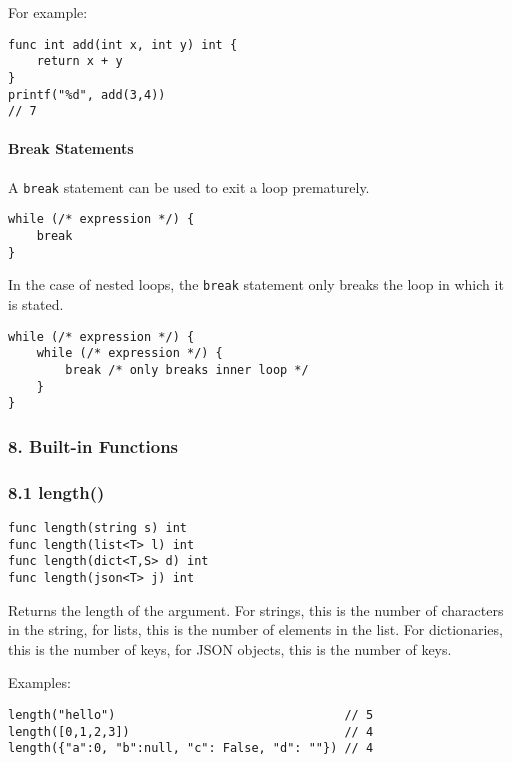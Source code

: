 For example:

\begin{verbatim}
func int add(int x, int y) int {
    return x + y
}
printf("%d", add(3,4))
// 7
\end{verbatim}

\paragraph{Break Statements}\label{break-statements}

A \texttt{break} statement can be used to exit a loop prematurely.

\begin{verbatim}
while (/* expression */) {
    break
}
\end{verbatim}

In the case of nested loops, the \texttt{break} statement only breaks
the loop in which it is stated.

\begin{verbatim}
while (/* expression */) {
    while (/* expression */) {
        break /* only breaks inner loop */
    }
}
\end{verbatim}

\subsubsection*{8. Built-in Functions}\label{built-in-functions}

\subsubsection*{8.1 length()}\label{length}

\begin{verbatim}
func length(string s) int
func length(list<T> l) int
func length(dict<T,S> d) int
func length(json<T> j) int
\end{verbatim}

Returns the length of the argument. For strings, this is the number of
characters in the string, for lists, this is the number of elements in
the list. For dictionaries, this is the number of keys, for JSON
objects, this is the number of keys.

Examples:

\begin{verbatim}
length("hello")                                // 5
length([0,1,2,3])                              // 4
length({"a":0, "b":null, "c": False, "d": ""}) // 4
\end{verbatim}

